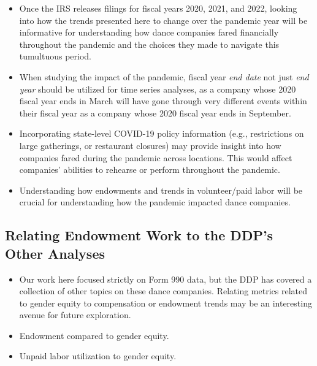 \documentclass[Dance Data
Project,article,submit,moreauthors,pdftex]{mdpi}
\providecommand{\tightlist}{%
  \setlength{\itemsep}{0pt}\setlength{\parskip}{0pt}}
\begin{document}
\begin{itemize}
\tightlist
\item
  Once the IRS releases filings for fiscal years 2020, 2021, and 2022,
  looking into how the trends presented here to change over the pandemic
  year will be informative for understanding how dance companies fared
  financially throughout the pandemic and the choices they made to
  navigate this tumultuous period.\\
\item
  When studying the impact of the pandemic, fiscal year \emph{end date}
  not just \emph{end year} should be utilized for time series analyses,
  as a company whose 2020 fiscal year ends in March will have gone
  through very different events within their fiscal year as a company
  whose 2020 fiscal year ends in September.\\
\item
  Incorporating state-level COVID-19 policy information (e.g.,
  restrictions on large gatherings, or restaurant closures) may provide
  insight into how companies fared during the pandemic across locations.
  This would affect companies' abilities to rehearse or perform
  throughout the pandemic.
\item
  Understanding how endowments and trends in volunteer/paid labor will
  be crucial for understanding how the pandemic impacted dance
  companies.
\end{itemize}

\hypertarget{relating-endowment-work-to-the-ddps-other-analyses}{%
\subsection{Relating Endowment Work to the DDP's Other
Analyses}\label{relating-endowment-work-to-the-ddps-other-analyses}}

\begin{itemize}
\tightlist
\item
  Our work here focused strictly on Form 990 data, but the DDP has
  covered a collection of other topics on these dance companies.
  Relating metrics related to gender equity to compensation or endowment
  trends may be an interesting avenue for future exploration.\\
\item
  Endowment compared to gender equity.\\
\item
  Unpaid labor utilization to gender equity.
\end{itemize}
\end{document}
